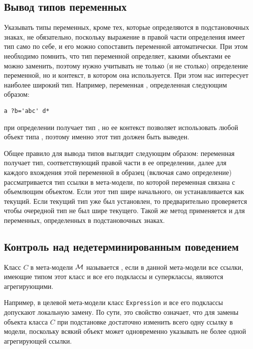 \subsection{Вывод типов переменных}

Указывать типы переменных, кроме тех, которые определяются в подстановочных знаках, не обязательно, поскольку выражение в правой части определения имеет тип само по себе, и его можно сопоставить переменной автоматически. При этом необходимо помнить, что тип переменной определяет, какими объектами ее можно заменить, поэтому нужно учитывать не только (и не столько) определение переменной, но и контекст, в котором она используется. При этом нас интересует наиболее широкий тип. Например, переменная , определенная следующим образом:
\begin{lstlisting}
a ?b='abc' d*
\end{lstlisting}
при определении получает тип , но ее контекст позволяет использовать любой объект типа , поэтому именно этот тип должен быть выведен.

Общее правило для вывода типов выглядит следующим образом: переменная получает  тип, соответствующий правой части в ее определении, далее для каждого вхождения этой переменной в образец (включая само определение) рассматривается тип ссылки в мета-модели, по которой переменная связана с объемлющим объектом. Если этот тип шире начального, он устанавливается как текущий. Если текущий тип уже был установлен, то предварительно проверяется чтобы очередной тип не был шире текущего. Такой же метод применяется и для переменных, определенных в подстановочных знаках.

\subsection{Контроль над недетерминированным поведением}

\begin{Def}
Класс $C$ в мета-модели $\mathcal{M}$ называется , если в данной мета-модели все ссылки, имеющие типом этот класс и все его подклассы и суперклассы, являются агрегирующими.
\end{Def}
Например, в целевой мета-модели  класс \texttt{Expression} и все его подклассы допускают локальную замену. По сути, это свойство означает, что для замены объекта класса $C$ при подстановке достаточно изменить всего одну ссылку в модели, поскольку всякий объект может одновременно указывать не более одной агрегирующей ссылки.

